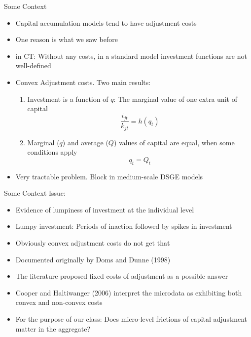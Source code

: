 \documentclass[english,xcolor=svgnames,aspectratio=169]{beamer}
\begin{document}
\begin{frame}{Some Context}
\begin{itemize}
\item Capital accumulation models tend to have adjustment costs
\item One reason is what we saw before
\item in CT: Without any costs, in a standard model investment functions are not well-defined
\item Convex Adjustment costs. Two main results:
\begin{enumerate}
\item Investment is a function of $q$: The marginal value of one extra unit of capital
\[\frac{i_{jt}}{k_{jt}} = h(q_t)\]
\item Marginal ($q$) and average ($Q$) values of capital are equal, when some conditions apply
\[q_t = Q_t\]
\end{enumerate}
\item Very tractable problem. Block in medium-scale DSGE models
\end{itemize}
\end{frame}

\begin{frame}{Some Context}
Issue:
\begin{itemize}
\item Evidence of lumpiness of investment at the individual level
\item Lumpy investment: Periods of inaction followed by spikes in investment
\item Obviously convex adjustment costs do not get that
\item Documented originally by Doms and Dunne (1998)
\item The literature proposed fixed costs of adjustment as a possible answer
\item Cooper and Haltiwanger (2006) interpret the microdata as exhibiting both convex and non-convex costs
\item For the purpose of our class: Does micro-level frictions of capital adjustment matter in the aggregate?
\end{itemize}
\end{frame}
\end{document}

